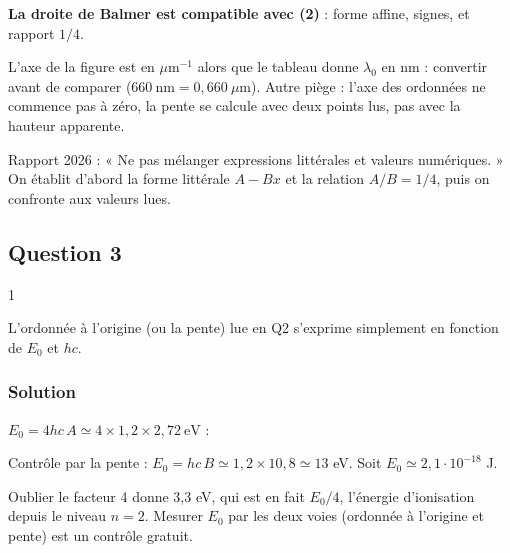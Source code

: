 \documentclass[11pt,a4paper]{article}
\newcommand{\equationajustee}[1]{%
  \sbox{\boiteequation}{$\displaystyle #1$}%
  \ifdim\wd\boiteequation>\linewidth
    \[\resizebox{\linewidth}{!}{\usebox{\boiteequation}}\]%
  \else
    \[#1\]%
  \fi}
\begin{document}
\textbf{La droite de Balmer est compatible avec (2)} : forme affine, signes, et rapport \(1/4\).

\begin{piege}

L'axe de la figure est en \(\mu\mathrm m^{-1}\) alors que le tableau donne \(\lambda_0\) en nm : convertir avant de comparer (\(660\ \mathrm{nm}=0{,}660\ \mu\mathrm m\)). Autre piège : l'axe des ordonnées ne commence pas à zéro, la pente se calcule avec deux points lus, pas avec la hauteur apparente.

\end{piege}

\begin{jury}

Rapport 2026 : « Ne pas mélanger expressions littérales et valeurs numériques. » On établit d'abord la forme littérale \(A-Bx\) et la relation \(A/B=1/4\), puis on confronte aux valeurs lues.

\end{jury}

\hypertarget{question-3}{%
\subsection{Question 3}\label{question-3}}

\begin{indication}{1}

L'ordonnée à l'origine (ou la pente) lue en Q2 s'exprime simplement en fonction de \(E_0\) et \(hc\).

\end{indication}

\hypertarget{solution-2}{%
\subsubsection{Solution}\label{solution-2}}

\(E_0=4hc\,A\simeq4\times1{,}2\times2{,}72\ \mathrm{eV}\) :

\equationajustee{\boxed{E_0\simeq13\ \mathrm{eV}}}

Contrôle par la pente : \(E_0=hc\,B\simeq1{,}2\times10{,}8\simeq13\) eV. Soit \(E_0\simeq2{,}1\cdot10^{-18}\) J.

\begin{piege}

Oublier le facteur 4 donne 3,3 eV, qui est en fait \(E_0/4\), l'énergie d'ionisation depuis le niveau \(n=2\). Mesurer \(E_0\) par les deux voies (ordonnée à l'origine et pente) est un contrôle gratuit.

\end{piege}
\end{document}
